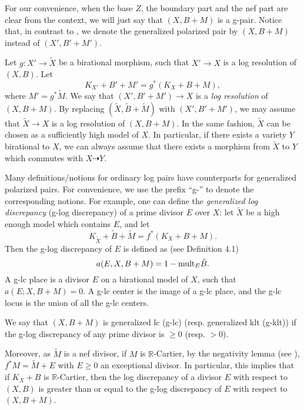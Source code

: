 \documentclass[11pt]{amsart}
\newcommand{\Rr}{\mathbb{R}}
\begin{document}
For our convenience, when the base $Z$, the boundary part and the nef part are clear from the context, we will just say that $(X,B+M)$ is a g-pair. Notice that, in contrast to \cite{BZ16}, we denote the generalized polarized pair by $(X, B+M)$ instead of $(X', B'+M')$.


Let $g:X'\to \tilde{X}$ be a birational morphism, 
such that $X'\to X$ is a log resolution of $(X,B)$. Let
$$K_{X'}+B'+M'=g^{*}(K_X+B+M),$$
where $M'=g^{*}\tilde{M}$. 
We say that $(X',B'+M')\to X$ is a \emph{log resolution} of $(X,B+M)$. By replacing $(\tilde{X},\tilde{B}+\tilde{M})$ with $(X', B'+M')$, we may assume that $\tilde X\to X$ is a log resolution of $(X,B+M)$. In the same fashion, $\tilde X$ can be chosen as a sufficiently high model of $X$. In particular, if there exists a variety $Y$ birational to $X$, we can always assume that there exists a morphism from $\tilde X$ to $Y$ which commutes with $X \dasharrow Y$.

Many definitions/notions for ordinary log pairs have counterparts for generalized polarized pairs. For convenience, we use the prefix ``g-'' to denote the corresponding notions. For example, one can define the \emph{generalized log discrepancy} (g-log discrepancy) of a prime divisor $E$ over $X$: let $\tilde X$ be a high enough model which contains $E$, and let
\[
K_{\tilde X}+\tilde B+\tilde M=f^*(K_{X}+B+M).
\] Then the g-log discrepancy of $E$ is defined as (see \cite{BZ16} Definition 4.1)
\[
a(E, X, B+M)=1-{\rm mult}_E\tilde B.
\] 
A g-lc place is a divisor $E$ on a birational model of $X$, such that $a(E; X, B+M)=0$. A g-lc center is the image of a g-lc place, and the g-lc locus is the union of all the g-lc centers.

\medskip

We say that $(X,B+M)$ is generalized lc (g-lc) (resp. generalized klt (g-klt)) if the g-log discrepancy of any prime divisor is $\geq 0$ (resp. $>0$). 

Moreover, as $\tilde M$ is a nef divisor, if $M$ is $\Rr$-Cartier, by the negativity lemma (see \cite[Lemma 3.39]{KM98}), $f^* M=\tilde M+E$ with $E \geq 0$ an exceptional divisor. In particular, this implies that if $K_{X}+B$ is $\Rr$-Cartier, then the log discrepancy of a divisor $E$ with respect to $(X, B)$ is greater than or equal to the g-log discrepancy of $E$ with respect to $(X, B+M)$.
\end{document}
